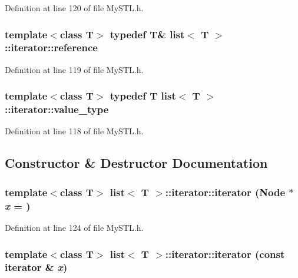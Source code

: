 Definition at line 120 of file MySTL.h.

\subsubsection[{reference}]{\setlength{\rightskip}{0pt plus 5cm}template$<$class T$>$ typedef T\& {\bf list}$<$ T $>$::{\bf iterator::reference}}\label{classlist_1_1iterator_a67117308303156c5b6419ad9439d2376}


Definition at line 119 of file MySTL.h.

\subsubsection[{value\_\-type}]{\setlength{\rightskip}{0pt plus 5cm}template$<$class T$>$ typedef T {\bf list}$<$ T $>$::{\bf iterator::value\_\-type}}\label{classlist_1_1iterator_a16a37ebb2080acea47a55dd72a9753c2}


Definition at line 118 of file MySTL.h.



\subsection{Constructor \& Destructor Documentation}
\subsubsection[{iterator}]{\setlength{\rightskip}{0pt plus 5cm}template$<$class T$>$ {\bf list}$<$ T $>$::iterator::iterator (Node $\ast$ {\em x} = {})}\label{classlist_1_1iterator_aed6d36c5154555d309acb69c1cc0b5db}


Definition at line 124 of file MySTL.h.

\subsubsection[{iterator}]{\setlength{\rightskip}{0pt plus 5cm}template$<$class T$>$ {\bf list}$<$ T $>$::iterator::iterator (const {\bf iterator} \& {\em x})}\label{classlist_1_1iterator_ab3e5d6ca4d611f3a188d36a7df41df18}


